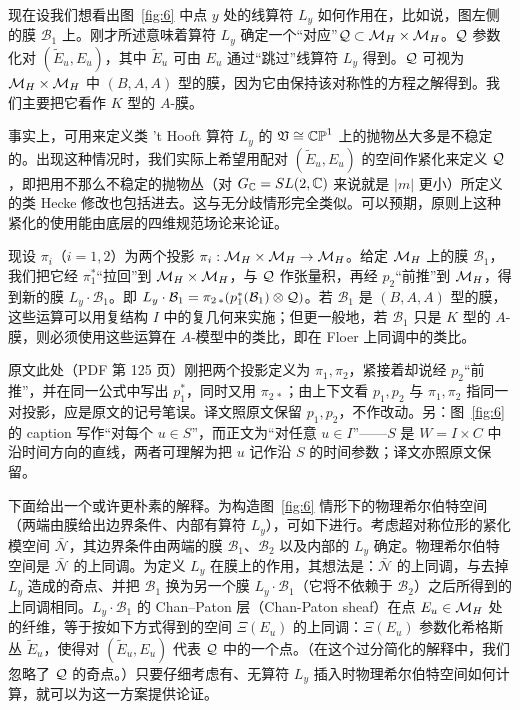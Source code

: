 现在设我们想看出图~\ref{fig:6} 中点 $y$ 处的线算符 $L_y$ 如何作用在，比如说，图左侧的膜 ${\mathcal B}_1$ 上。刚才所述意味着算符 $L_y$ 确定一个“对应”${\mathcal{Q}}\subset {{\mathcal{M}}_H}\times {{\mathcal{M}}_H}$。$\mathcal{Q}$ 参数化对 $(\tilde E_u,E_u)$，其中 $\tilde E_u$ 可由 $E_u$ 通过“跳过”线算符 $L_y$ 得到。$\mathcal{Q}$ 可视为 ${{\mathcal{M}}_H}\times {{\mathcal{M}}_H}$ 中 $(B,A,A)$ 型的膜，因为它由保持该对称性的方程之解得到。我们主要把它看作 $K$ 型的 $A$-膜。

事实上，可用来定义类 't Hooft 算符 $L_y$ 的 $\mathfrak{V}\cong \mathbb{CP}^1$ 上的抛物丛大多是不稳定的。出现这种情况时，我们实际上希望用配对 $(\tilde E_u, E_u)$ 的空间作紧化来定义 $\mathcal{Q}$，即把用不那么不稳定的抛物丛（对 $G_{\mathbb{C}}=SL(2,{\mathbb{C}})$ 来说就是 $|m|$ 更小）所定义的类 Hecke 修改也包括进去。这与无分歧情形完全类似。可以预期，原则上这种紧化的使用能由底层的四维规范场论来论证。

现设 $\pi_i$（$i=1,2$）为两个投影 $\pi_i:{{\mathcal{M}}_H}\times{{\mathcal{M}}_H}\to {{\mathcal{M}}_H}$。给定 ${{\mathcal{M}}_H}$ 上的膜 ${\mathcal B}_1$，我们把它经 $\pi_1^*$“拉回”到 ${{\mathcal{M}}_H}\times {{\mathcal{M}}_H}$，与 $\mathcal{Q}$ 作张量积，再经 $p_{2}$“前推”到 ${{\mathcal{M}}_H}$，得到新的膜 $L_y\cdot {\mathcal B}_1$。即 $L_y\cdot {\mathcal B}_1=\pi_{2\,*}(p_1^*({\mathcal B}_1)\otimes
\mathcal{Q})$。若 ${\mathcal B}_1$ 是 $(B,A,A)$ 型的膜，这些运算可以用复结构 $I$ 中的复几何来实施；但更一般地，若 ${\mathcal B}_1$ 只是 $K$ 型的 $A$-膜，则必须使用这些运算在 $A$-模型中的类比，即在 Floer 上同调中的类比。
\begin{yizhu}[原文疑误]
原文此处（PDF 第 125 页）刚把两个投影定义为 $\pi_1,\pi_2$，紧接着却说经 $p_2$“前推”，并在同一公式中写出 $p_1^*$，同时又用 $\pi_{2\,*}$；由上下文看 $p_1,p_2$ 与 $\pi_1,\pi_2$ 指同一对投影，应是原文的记号笔误。译文照原文保留 $p_1,p_2$，不作改动。另：图~\ref{fig:6} 的 caption 写作“对每个 $u\in S$”，而正文为“对任意 $u\in I$”——$S$ 是 $W=I\times C$ 中沿时间方向的直线，两者可理解为把 $u$ 记作沿 $S$ 的时间参数；译文亦照原文保留。
\end{yizhu}


下面给出一个或许更朴素的解释。为构造图~\ref{fig:6} 情形下的物理希尔伯特空间（两端由膜给出边界条件、内部有算符 $L_y$），可如下进行。考虑超对称位形的紧化模空间 $\bar{\mathcal N}$，其边界条件由两端的膜 ${\mathcal B}_1$、${\mathcal B}_2$ 以及内部的 $L_y$ 确定。物理希尔伯特空间是 $\bar{\mathcal N}$ 的上同调。为定义 $L_y$ 在膜上的作用，其想法是：$\bar{\mathcal N}$ 的上同调，与去掉 $L_y$ 造成的奇点、并把 ${\mathcal B}_1$ 换为另一个膜 $L_y\cdot{\mathcal B}_1$（它将不依赖于 ${\mathcal B}_2$）之后所得到的上同调相同。$L_y\cdot{\mathcal B}_1$ 的 Chan–Paton 层（Chan-Paton sheaf）在点 $E_u\in{{\mathcal{M}}_H}$ 处的纤维，等于按如下方式得到的空间 $\Xi(E_u)$ 的上同调：$\Xi(E_u)$ 参数化希格斯丛 $\tilde E_u$，使得对 $(\tilde E_u,E_u)$ 代表 $\mathcal{Q}$ 中的一个点。（在这个过分简化的解释中，我们忽略了 $\mathcal{Q}$ 的奇点。）只要仔细考虑有、无算符 $L_y$ 插入时物理希尔伯特空间如何计算，就可以为这一方案提供论证。

